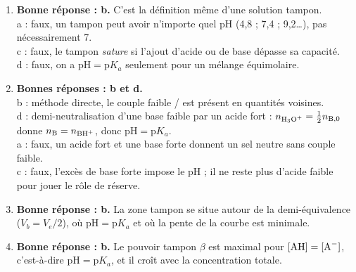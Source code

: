 \documentclass[11pt]{article}
\begin{document}
\begin{corrige}
\begin{enumerate}
  \item \textbf{Bonne réponse : b.} C'est la définition même d'une solution tampon. \\
  a : faux, un tampon peut avoir n'importe quel pH (4,8 ; 7,4 ; 9,2\ldots), pas nécessairement 7. \\
  c : faux, le tampon \emph{sature} si l'ajout d'acide ou de base dépasse sa capacité. \\
  d : faux, on a $\mathrm{pH} = \mathrm{p}K_a$ seulement pour un mélange équimolaire.
  \item \textbf{Bonnes réponses : b et d.} \\
  b : méthode directe, le couple faible / est présent en quantités voisines. \\
  d : demi-neutralisation d'une base faible par un acide fort : $n_{\ce{H3O+}} = \tfrac{1}{2}n_{\ce{B},0}$ donne $n_{\ce{B}} = n_{\ce{BH+}}$, donc $\mathrm{pH} = \mathrm{p}K_a$. \\
  a : faux, un acide fort et une base forte donnent un sel neutre sans couple faible. \\
  c : faux, l'excès de base forte impose le pH ; il ne reste plus d'acide faible pour jouer le rôle de réserve.
  \item \textbf{Bonne réponse : b.} La zone tampon se situe autour de la demi-équivalence ($V_b = V_e/2$), où $\mathrm{pH} = \mathrm{p}K_a$ et où la pente de la courbe est minimale.
  \item \textbf{Bonne réponse : b.} Le pouvoir tampon $\beta$ est maximal pour $[\ce{AH}] = [\ce{A-}]$, c'est-à-dire $\mathrm{pH} = \mathrm{p}K_a$, et il croît avec la concentration totale.
\end{enumerate}
\end{corrige}
\end{document}
